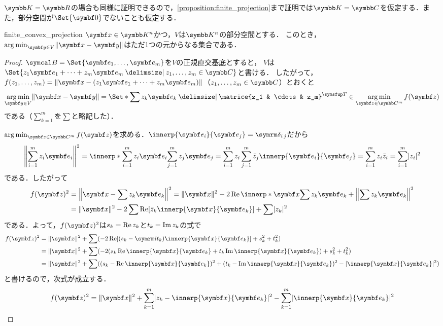 \documentclass[../../main]{subfiles}
\begin{document}
\(\numset{K}=\numset{R}\)の場合も同様に証明できるので，\cref{proposition:finite_projection}まで証明では\(\numset{K}=\numset{C}\)を仮定する．また，部分空間が\(\Set{\zvec}\)でないことも仮定する．

\begin{proposition}{}{finite_convex_projection}
  \(\vect{x}\in\numset{K}^n\)かつ，\(V\)は\(\numset{K}^n\)の部分空間とする．
  このとき，\(\argmin_{\vect{y}\in V}\vnorm{\vect{x}-\vect{y}}\)はただ1つの元からなる集合である．
\end{proposition}

\begin{proof}
  \(\basis{B}=\Set{\vect{e}_1,\dots,\vect{e}_m}\)を\(V\)の正規直交基底とすると，
  \(V\)は\(\Set{z_1\vect{e}_1+\dots+z_m\vect{e}_m\given z_1,\dots,z_m\in\numset{C}}\)と書ける．
  したがって，\(f(z_1,\dots,z_m)=\vnorm{\vect{x}-(z_1\vect{e}_1+\dots+z_m\vect{e}_m)}\)（\(z_1,\dots,z_m\in\numset{C}\)）とおくと
  \[
    \argmin_{\vect{y}\in V}\vnorm{\vect{x}-\vect{y}} = \Set*{\sum z_k\vect{e}_k\given\trps{\matrice{z_1 & \cdots & z_m}}\in\argmin_{\vect{z}\in\numset{C}^m}f(\vect{z})}
  \]
  である（\(\sum_{k=1}^m\)を\(\sum\)と略記した）．

  \(\argmin_{\vect{z}\in\numset{C}^m}f(\vect{z})\)を求める．\(\innerp{\vect{e}_i}{\vect{e}_j}=\kdelta{i}{j}\)だから
  \[
    \vnorm*{\sum_{i=1}^mz_i\vect{e}_i}^2 = \innerp*{\sum_{i=1}^mz_i\vect{e}_i}{\sum_{j=1}^mz_j\vect{e}_j}
    = \sum_{i=1}^mz_i\sum_{j=1}^m\conj{z}_j\innerp{\vect{e}_i}{\vect{e}_j}
    = \sum_{i=1}^mz_i\conj{z}_i
    = \sum_{i=1}^m\abs{z_i}^2
  \]
  である．したがって
  \begin{align*}
    f(\vect{z})^2 &= \vnorm*{\vect{x}-\sum z_k\vect{e}_k}^2 = \vnorm{\vect{x}}^2-2\rpart\innerp*{\vect{x}}{\sum z_k\vect{e}_k}+\vnorm*{\sum z_k\vect{e}_k}^2 \\
    &= \vnorm{\vect{x}}^2-2\sum\rpart[\conj{z}_k\innerp{\vect{x}}{\vect{e}_k}]+\sum\abs{z_k}^2
  \end{align*}
  である．よって，\(f(\vect{z})^2\)は\(s_k=\operatorname{Re} z_k\)と\(t_k=\operatorname{Im} z_k\)の式で
  \begin{align*}
    f(\vect{z})^2 &= \vnorm{\vect{x}}^2+\sum(-2\rpart[(s_k-\iuni t_k)\innerp{\vect{x}}{\vect{e}_k}]+s_k^2+t_k^2) \\
    &= \vnorm{\vect{x}}^2+\sum(-2(s_k\rpart\innerp{\vect{x}}{\vect{e}_k}+t_k\ipart\innerp{\vect{x}}{\vect{e}_k})+s_k^2+t_k^2) \\
    &= \vnorm{\vect{x}}^2+\sum((s_k-\rpart\innerp{\vect{x}}{\vect{e}_k})^2+(t_k-\ipart\innerp{\vect{x}}{\vect{e}_k})^2-\abs{\innerp{\vect{x}}{\vect{e}_k}}^2)
  \end{align*}
  と書けるので，次式が成立する．
  \begin{equation}
    \label{equation:pre_bessels_inequality}
    f(\vect{z})^2 = \vnorm{\vect{x}}^2+\sum_{k=1}^m\abs{z_k-\innerp{\vect{x}}{\vect{e}_k}}^2-\sum_{k=1}^m\abs{\innerp{\vect{x}}{\vect{e}_k}}^2
  \end{equation}


\end{proof}
\end{document}

